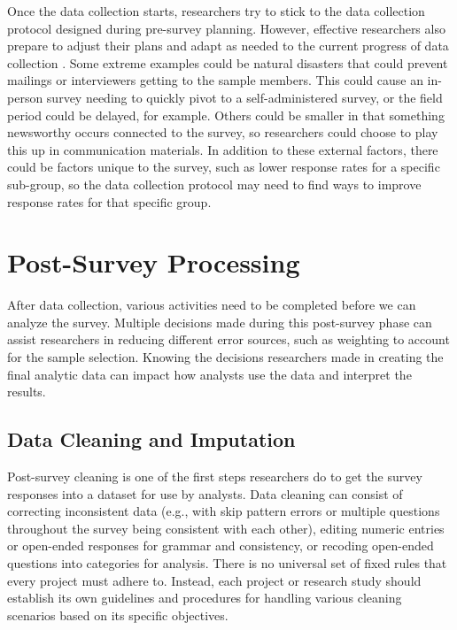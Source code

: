 \documentclass[
]{krantz}
\begin{document}
Once the data collection starts, researchers try to stick to the data collection protocol designed during pre-survey planning. However, effective researchers also prepare to adjust their plans and adapt as needed to the current progress of data collection \citep{Schouten2018}. Some extreme examples could be natural disasters that could prevent mailings or interviewers getting to the sample members. This could cause an in-person survey needing to quickly pivot to a self-administered survey, or the field period could be delayed, for example. Others could be smaller in that something newsworthy occurs connected to the survey, so researchers could choose to play this up in communication materials. In addition to these external factors, there could be factors unique to the survey, such as lower response rates for a specific sub-group, so the data collection protocol may need to find ways to improve response rates for that specific group.

\hypertarget{overview-post}{%
\section{Post-Survey Processing}\label{overview-post}}

After data collection, various activities need to be completed before we can analyze the survey. Multiple decisions made during this post-survey phase can assist researchers in reducing different error sources, such as weighting to account for the sample selection. Knowing the decisions researchers made in creating the final analytic data can impact how analysts use the data and interpret the results.

\hypertarget{overview-post-cleaning}{%
\subsection{Data Cleaning and Imputation}\label{overview-post-cleaning}}

Post-survey cleaning is one of the first steps researchers do to get the survey responses into a dataset for use by analysts. Data cleaning can consist of correcting inconsistent data (e.g., with skip pattern errors or multiple questions throughout the survey being consistent with each other), editing numeric entries or open-ended responses for grammar and consistency, or recoding open-ended questions into categories for analysis. There is no universal set of fixed rules that every project must adhere to. Instead, each project or research study should establish its own guidelines and procedures for handling various cleaning scenarios based on its specific objectives.
\end{document}
